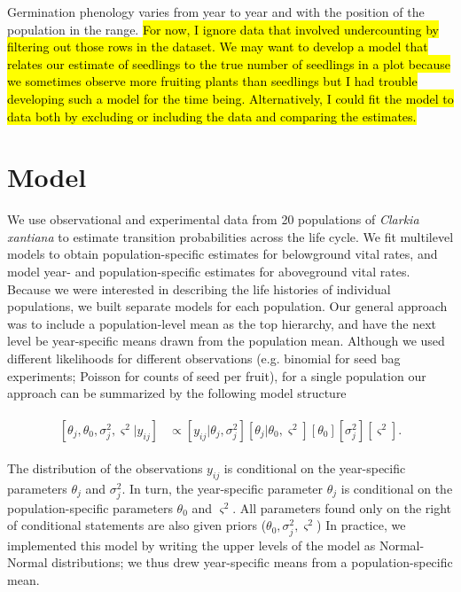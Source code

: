 \documentclass[12pt, oneside, titlepage]{article}   	%
\begin{document}
Germination phenology varies from year to year and with the position of the population in the range. \hl{For now, I ignore data that involved undercounting by filtering out those rows in the dataset. We may want to develop a model that relates our estimate of seedlings to the true number of seedlings in a plot because we sometimes observe more fruiting plants than seedlings but I had trouble developing such a model for the time being. Alternatively, I could fit the model to data both by excluding or including the data and comparing the estimates.}

\section{Model}

We use observational and experimental data from 20 populations of \textit{Clarkia xantiana} to estimate transition probabilities across the life cycle. We fit multilevel models to obtain population-specific estimates for belowground vital rates, and model year- and population-specific estimates for aboveground vital rates. Because we were interested in describing the life histories of individual populations, we built separate models for each population. Our general approach was to include a population-level mean as the top hierarchy, and have the next level be year-specific means drawn from the population mean. Although we used different likelihoods for different observations (e.g. binomial for seed bag experiments; Poisson for counts of seed per fruit), for a single population our approach can be summarized by the following model structure

\begin{align}
  \begin{split}
  [ \theta_j , \theta_0 , \sigma_j^2 , \varsigma^2 | y_{ij} ] &  \propto [ y_{ij} | \theta_j , \sigma^2_j] [ \theta_j | \theta_0 , \varsigma^2 ] [ \theta_0 ] [ \sigma^2_j] [ \varsigma^2].
  \end{split}
\end{align}

The distribution of the observations $y_{ij}$ is conditional on the year-specific parameters $\theta_j$ and $\sigma^2_j$. In turn, the year-specific parameter $\theta_j$ is conditional on the population-specific parameters $\theta_0$ and $ \varsigma^2$. All parameters found only on the right of conditional statements are also given priors ($\theta_0, \sigma^2_j, \varsigma^2$) In practice, we implemented this model by writing the upper levels of the model as Normal-Normal distributions; we thus drew year-specific means from a population-specific mean.
\end{document}
